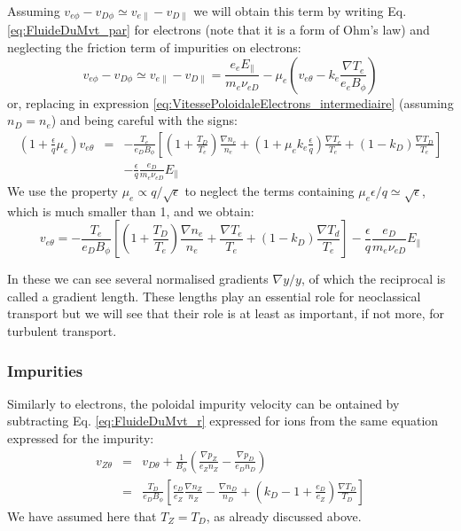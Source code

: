 Assuming $v_{e\phi}-v_{D\phi} \simeq v_{e\|} - v_{D\|}$ we will obtain this term by writing Eq. \ref{eq:FluideDuMvt_par} for electrons (note that it is a form of Ohm's law) and neglecting the friction term of impurities on electrons:
\[
		v_{e\phi} - v_{D\phi} \simeq v_{e\|} - v_{D\|} = \frac{e_e E_\|}{m_e \nu_{eD}} - \mu_e \left( v_{e\theta} - k_e\frac{\nabla T_e}{e_e B_\phi} \right)
\]
or, replacing in expression \ref{eq:VitessePoloidaleElectrons_intermediaire} (assuming $n_D = n_e$) and being careful with the signs:
\begin{eqnarray}
		\left( 1 + \frac{\epsilon}{q}\mu_e \right)v_{e\theta} 	&	= &	-\frac{T_e}{e_D B_\phi} \left[ \left(1 + \frac{T_D}{T_e} \right)\frac{\nabla n_e}{n_e} + \left( 1 + \mu_e k_e\frac{\epsilon}{q} \right)\frac{\nabla T_e}{T_e} + \left( 1-k_D \right)\frac{\nabla T_D}{T_e} \right] \nonumber	\\
		&	&	- \frac{\epsilon}{q}\frac{e_D}{m_e \nu_{eD}}E_\|
\end{eqnarray}
We use the property $\mu_e \propto q/\sqrt{\epsilon}$ to neglect the terms containing $\mu_e\epsilon/q \simeq \sqrt{\epsilon}$, which is much smaller than 1, and we obtain:
\begin{equation}
		v_{e\theta} =	-\frac{T_e}{e_D B_\phi} \left[ \left(1 + \frac{T_D}{T_e} \right)\frac{\nabla n_e}{n_e} + \frac{\nabla T_e}{T_e} + \left( 1-k_D \right)\frac{\nabla T_d}{T_e} \right] - \frac{\epsilon}{q}\frac{e_D}{m_e \nu_{eD}}E_\|
		\label{eq:VthetaElectrons}
\end{equation}

In these we can see several normalised gradients $\nabla y/y$, of which the reciprocal is called a gradient length. These lengths play an essential role for neoclassical transport but we will see that their role is at least as important, if not more, for turbulent transport.


						\subsubsection{Impurities}
						\label{sec:VthetaImpuretes}


Similarly to electrons, the poloidal impurity velocity can be ontained by subtracting Eq. \ref{eq:FluideDuMvt_r} expressed for ions from the same equation expressed for the impurity:
\begin{eqnarray}
		v_{Z\theta} &	= &	v_{D\theta} + \frac{1}{B_\phi} \left( \frac{\nabla p_Z}{e_Z n_Z} - \frac{\nabla p_D}{e_D n_D} \right)			\nonumber		\\
								& = &	\frac{T_D}{e_D B_\phi} \left[ \frac{e_D}{e_Z}\frac{\nabla n_Z}{n_Z} - \frac{\nabla n_D}{n_D} + \left( k_D-1+\frac{e_D}{e_Z} \right) \frac{\nabla T_D}{T_D}\right]
								\label{eq:VthetaImpuretes}
\end{eqnarray}
We have assumed here that $T_Z = T_D$, as already discussed above.



